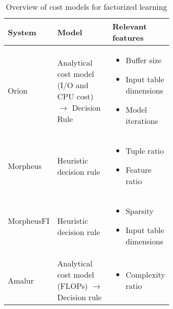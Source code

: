 \begin{table}[ht]
  \centering
  \begin{tabular}{lp{0.35\linewidth}p{0.32\linewidth}}
    \toprule
    System                                          & Model                                                                & Relevant features                                                                                                                           \\ \midrule \midrule
    Orion     ~\cite{orion_learning_gen_lin_models} & Analytical cost model (I/O and CPU cost) $\rightarrow$ Decision Rule & \begin{itemize}[noitemsep,topsep=0pt,leftmargin=0.3cm] \item Buffer size \item Input table dimensions \item Model iterations  \end{itemize} \\ \midrule
    Morpheus   ~\cite{morpheus}                     & Heuristic decision rule                                              & \begin{itemize}[noitemsep,topsep=0pt,leftmargin=0.3cm] \item Tuple ratio \item Feature ratio  \end{itemize}                                 \\\midrule
    MorpheusFI ~\cite{MorpheusFI}                   & Heuristic decision rule                                              & \begin{itemize}[noitemsep,topsep=0pt,leftmargin=0.3cm] \item Sparsity \item Input table dimensions \end{itemize}                            \\\midrule
    Amalur    ~\cite{amalur_tkde24}                 & Analytical cost model (FLOPs) $\rightarrow$ Decision rule            & \begin{itemize}[noitemsep,topsep=0pt,leftmargin=00.3cm] \item Complexity ratio \end{itemize}                                                \\
    \bottomrule
  \end{tabular}
  \caption{Overview of cost models for factorized learning}
  \label{tab:cost_model_overview}
\end{table}

